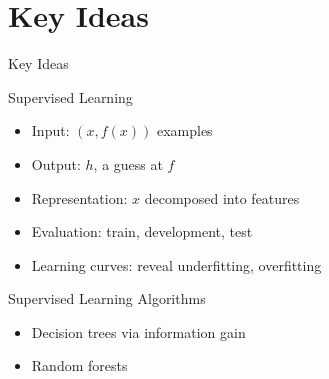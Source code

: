 \documentclass[14pt]{beamer}
\begin{document}
\part{Key Ideas}

\begin{frame}{Key Ideas}
\begin{block}{Supervised Learning}
\begin{itemize}
\item Input: $(x, f(x))$ examples
\item Output: $h$, a guess at $f$
\item Representation: $x$ decomposed into features
\item Evaluation: train, development, test
\item Learning curves: reveal underfitting, overfitting
\end{itemize}
\end{block}
\begin{block}{Supervised Learning Algorithms}
\begin{itemize}
\item Decision trees via information gain
\item Random forests
\end{itemize}
\end{block}
\end{frame}
\end{document}
